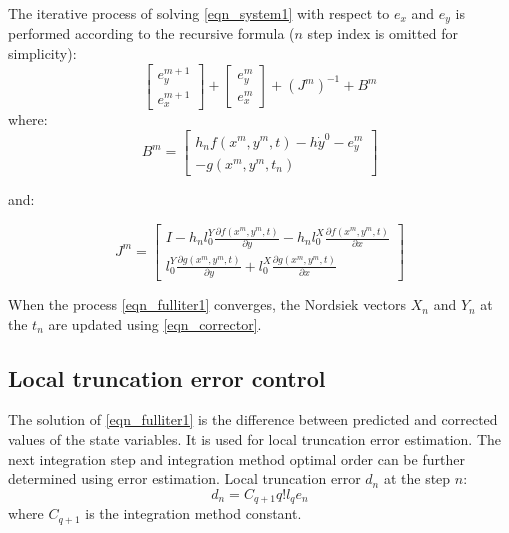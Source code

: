 \documentclass[lettersize,journal]{IEEEtran}
\begin{document}
The iterative process of solving \eqref{eqn_system1} with respect to \(e_x\) and \(e_y\) is performed according to the recursive formula (\(n\) step index is omitted for simplicity):
\begin{equation}
	\label{eqn_fulliter1}
	\begin{bmatrix}
		e_{y}^{m+1} \\
		e_{x}^{m+1} 
	\end{bmatrix}
	+ 
	\begin{bmatrix}
		e_{y}^m \\
		e_{x}^m 
	\end{bmatrix}
	+ (J^{m})^{-1}
	+
	B^m
\end{equation}
\noindent where:
\begin{equation}
	B^m = 
	\begin{bmatrix}
		h_nf(x^m, y^m, t) - h \dot{y}^0 - e_y^m \\
		-g(x^m, y^m, t_n) 
	\end{bmatrix}
\end{equation}

\noindent and:

\begin{equation}
	J^m = \begin{bmatrix}
	I - h_nl_0^Y\frac{\partial f(x^m, y^m, t)}{\partial y}  -  h_nl_0^X\frac{\partial f(x^m, y^m, t)}{\partial x} \\
	l_0^Y\frac{\partial g(x^m, y^m, t)}{\partial y} +  l_0^X\frac{\partial g(x^m, y^m, t)}{\partial x} 
\end{bmatrix}
\end{equation}

When the process \eqref{eqn_fulliter1} converges, the Nordsiek vectors \(X_n\) and \(Y_n\) at the \(t_n\) are updated using \eqref{eqn_corrector}.
\subsection{Local truncation error control}
The solution of \eqref{eqn_fulliter1} is the difference between predicted and corrected values of the state variables. It is used for local truncation error estimation. The next integration step and integration method optimal order can be further determined using error estimation. Local truncation error \(d_n\) at the step \(n\):
\begin{equation}
	d_n=C_{q+1}q!l_qe_n
\end{equation}
\noindent where \(C_{q+1}\) is the integration method constant.
\end{document}
